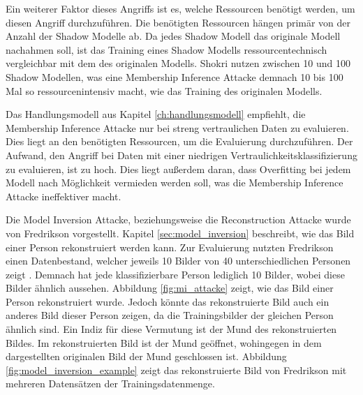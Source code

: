 Ein weiterer Faktor dieses Angriffs ist es, welche Ressourcen benötigt werden, um diesen Angriff durchzuführen.
Die benötigten Ressourcen hängen primär von der Anzahl der Shadow Modelle ab.
Da jedes Shadow Modell das originale Modell nachahmen soll, ist das Training eines Shadow Modells ressourcentechnisch vergleichbar mit dem des originalen Modells.
Shokri \etal \cite{P-2} nutzen zwischen 10 und 100 Shadow Modellen, was eine Membership Inference Attacke demnach 10 bis 100 Mal so ressourcenintensiv macht, wie das Training des originalen Modells.

Das Handlungsmodell aus Kapitel \ref{ch:handlungsmodell} empfiehlt, die Membership Inference Attacke nur bei streng vertraulichen Daten zu evaluieren. 
Dies liegt an den benötigten Ressourcen, um die Evaluierung durchzuführen.
Der Aufwand, den Angriff bei Daten mit einer niedrigen Vertraulichkeitsklassifizierung zu evaluieren, ist zu hoch.
Dies liegt außerdem daran, dass Overfitting bei jedem Modell nach Möglichkeit vermieden werden soll, was die Membership Inference Attacke ineffektiver macht.

Die Model Inversion Attacke, beziehungsweise die Reconstruction Attacke wurde von Fredrikson \etal \cite{P-3} vorgestellt. 
Kapitel \ref{sec:model_inversion} beschreibt, wie das Bild einer Person rekonstruiert werden kann.
Zur Evaluierung nutzten Fredrikson \etal \cite{P-3} einen Datenbestand, welcher jeweils 10 Bilder von 40 unterschiedlichen Personen zeigt \cite{att}.
Demnach hat jede klassifizierbare Person lediglich 10 Bilder, wobei diese Bilder ähnlich aussehen.
Abbildung \ref{fig:mi_attacke} zeigt, wie das Bild einer Person rekonstruiert wurde. 
Jedoch könnte das rekonstruierte Bild auch ein anderes Bild dieser Person zeigen, da die Trainingsbilder der gleichen Person ähnlich sind.
Ein Indiz für diese Vermutung ist der Mund des rekonstruierten Bildes. 
Im rekonstruierten Bild ist der Mund geöffnet, wohingegen in dem dargestellten originalen Bild der Mund geschlossen ist.
Abbildung \ref{fig:model_inversion_example} zeigt das rekonstruierte Bild von Fredrikson \etal \cite{P-3} mit mehreren Datensätzen der Trainingsdatenmenge.

